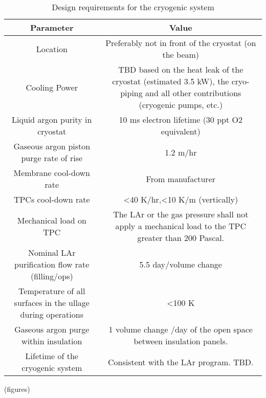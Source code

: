 \begin{table}[htpb]
\caption{Design requirements for the cryogenic system}
\label{tbl:cryo-design-parameters}
\centering
\begin{tabular}[htbp]{cc}
\hline
  Parameter & Value \\ \hline
 Location & Preferably not in front of the cryostat (on the beam) \\ \hline
 Cooling Power & TBD based on the heat leak of the cryostat (estimated 3.5 kW), the cryo-piping and all other contributions (cryogenic pumps, etc.) \\ \hline
 Liquid argon purity in cryostat & 10 ms electron lifetime (30 ppt O2 equivalent) \\ 
 Gaseous argon piston purge rate of rise & 1.2 m/hr \\ \hline
 Membrane cool-down rate & From manufacturer \\  \hline
 TPCs cool-down rate & <40 K/hr,<10 K/m (vertically)
 \\ \hline
Mechanical load on TPC & The LAr or the gas pressure shall not apply a mechanical load to the TPC greater than 200 Pascal. \\ \hline
Nominal LAr purification flow rate (filling/ops) & 5.5 day/volume change \\ \hline
 Temperature of all surfaces in the ullage during operations & <100 K \\ 
 Gaseous argon purge within insulation & 1 volume change /day of the open space between insulation panels. \\ \hline
 Lifetime of the cryogenic system & Consistent with the LAr program. TBD. \\ \hline
\end{tabular}
\end{table}


(figures)


